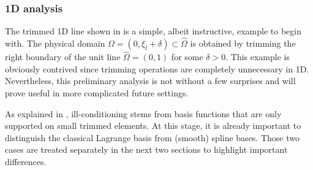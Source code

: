 \documentclass{article}
\numberwithin{equation}{section}
\theoremstyle{definition}
\begin{document}
\subsubsection{1D analysis}
\label{se: 1D_analysis}
The trimmed 1D line shown in  is a simple, albeit instructive, example to begin with. The physical domain $\Omega=(0,\xi_l+\delta) \subset \widehat{\Omega}$ is obtained by trimming the right boundary of the unit line $\widehat{\Omega}=(0,1)$ for some $\delta>0$. This example is obviously contrived since trimming operations are completely unnecessary in 1D. Nevertheless, this preliminary analysis is not without a few surprises and will prove useful in more complicated future settings.

As explained in , ill-conditioning stems from basis functions that are only supported on small trimmed elements. At this stage, it is already important to distinguish the classical Lagrange basis from (smooth) spline bases. Those two cases are treated separately in the next two sections to highlight important differences. \\
\end{document}
